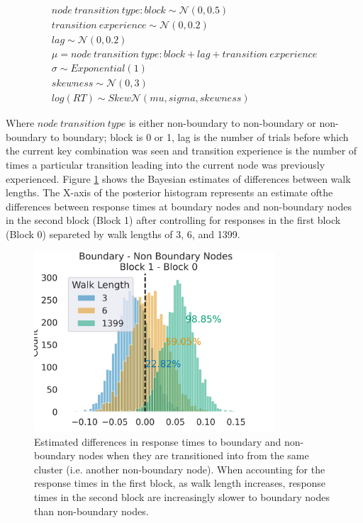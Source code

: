 \begin{equation}
	\begin{aligned}
		node\ transition\ type : block \sim \mathcal{N}(0, 0.5) \\ 
		transition\ experience \sim \mathcal{N}(0, 0.2) \\  
		lag \sim \mathcal{N}(0, 0.2) \\ 
		\mu = node\ transition\ type : block + lag + transition\ experience \\
		\sigma \sim Exponential(1) \\ 
		skewness \sim \mathcal{N}(0, 3) \\ 
		log(RT) \sim Skew\mathcal{N}(mu, sigma, skewness)
	\end{aligned}
\end{equation} 

Where $node\ transition\ type$ is either non-boundary to non-boundary or non-boundary to boundary; block is 0 or 1, lag is the number of trials before which the current key combination was seen and transition experience is the number of times a particular transition leading into the current node was previously experienced. Figure \ref{fig:bayesmodel-firsttwoblocks} shows the Bayesian estimates of differences between walk lengths. \ac{The X-axis of the posterior histogram represents an estimate ofthe differences between response times at boundary nodes and non-boundary nodes in the second block (Block 1) after controlling for responses in the first block (Block 0) separeted by walk lengths of 3, 6, and 1399.}

\begin{figure}[h]
	\centering
	\includegraphics[width = 0.8\textwidth]{chapter_notebooks/chapter_2/figures/nb_b_diff.png}
	\caption{\ac{Estimated} differences in response times to boundary and non-boundary nodes when they are transitioned into from the same cluster (i.e. another non-boundary node). When accounting for the response times in the first block, as walk length increases, response times in the second block are increasingly slower to boundary nodes than non-boundary nodes.}
	\label{fig:bayesmodel-firsttwoblocks}
\end{figure}


